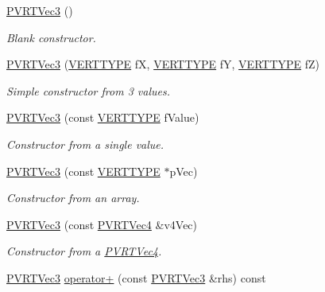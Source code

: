 \begin{DoxyCompactItemize}
\item 
\hyperlink{struct_p_v_r_t_vec3_a4d28d7a8c2c9323e5fd66156eb3a5259}{P\+V\+R\+T\+Vec3} ()
\begin{DoxyCompactList}\small\item\em Blank constructor. \end{DoxyCompactList}\item 
\hyperlink{struct_p_v_r_t_vec3_a9d4f3c351416f2bf8a583c23a311b478}{P\+V\+R\+T\+Vec3} (\hyperlink{group___a_p_i___o_g_l_e_s_ga06da457b7d3e93368ab904f89e1396be}{V\+E\+R\+T\+T\+Y\+P\+E} f\+X, \hyperlink{group___a_p_i___o_g_l_e_s_ga06da457b7d3e93368ab904f89e1396be}{V\+E\+R\+T\+T\+Y\+P\+E} f\+Y, \hyperlink{group___a_p_i___o_g_l_e_s_ga06da457b7d3e93368ab904f89e1396be}{V\+E\+R\+T\+T\+Y\+P\+E} f\+Z)
\begin{DoxyCompactList}\small\item\em Simple constructor from 3 values. \end{DoxyCompactList}\item 
\hyperlink{struct_p_v_r_t_vec3_ad9933da88efc5b213abc5de1edad8a59}{P\+V\+R\+T\+Vec3} (const \hyperlink{group___a_p_i___o_g_l_e_s_ga06da457b7d3e93368ab904f89e1396be}{V\+E\+R\+T\+T\+Y\+P\+E} f\+Value)
\begin{DoxyCompactList}\small\item\em Constructor from a single value. \end{DoxyCompactList}\item 
\hyperlink{struct_p_v_r_t_vec3_af0d437462f969b0aa3d844f6fa02d51e}{P\+V\+R\+T\+Vec3} (const \hyperlink{group___a_p_i___o_g_l_e_s_ga06da457b7d3e93368ab904f89e1396be}{V\+E\+R\+T\+T\+Y\+P\+E} $\ast$p\+Vec)
\begin{DoxyCompactList}\small\item\em Constructor from an array. \end{DoxyCompactList}\item 
\hyperlink{struct_p_v_r_t_vec3_af13da168bbd2394d64755112ba15e6fa}{P\+V\+R\+T\+Vec3} (const \hyperlink{struct_p_v_r_t_vec4}{P\+V\+R\+T\+Vec4} \&v4\+Vec)
\begin{DoxyCompactList}\small\item\em Constructor from a \hyperlink{struct_p_v_r_t_vec4}{P\+V\+R\+T\+Vec4}. \end{DoxyCompactList}\item 
\hyperlink{struct_p_v_r_t_vec3}{P\+V\+R\+T\+Vec3} \hyperlink{struct_p_v_r_t_vec3_a73949cf6e971d55b5073d090a0067118}{operator+} (const \hyperlink{struct_p_v_r_t_vec3}{P\+V\+R\+T\+Vec3} \&rhs) const 

\end{DoxyCompactItemize}

